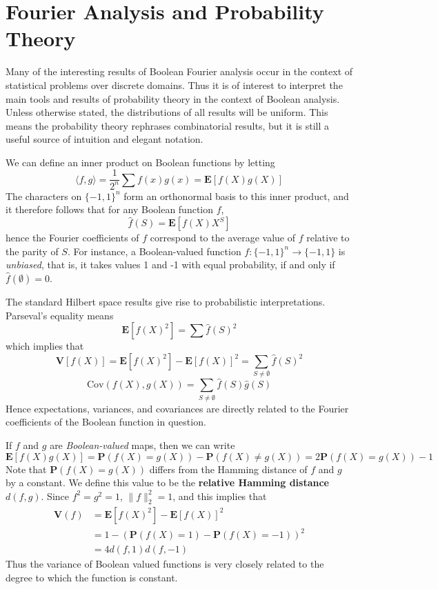 \section{Fourier Analysis and Probability Theory}

Many of the interesting results of Boolean Fourier analysis occur in the context of statistical problems over discrete domains. Thus it is of interest to interpret the main tools and results of probability theory in the context of Boolean analysis. Unless otherwise stated, the distributions of all results will be uniform. This means the probability theory rephrases combinatorial results, but it is still a useful source of intuition and elegant notation.

We can define an inner product on Boolean functions by letting
%
\[ \langle f, g \rangle = \frac{1}{2^n} \sum f(x)g(x) = \mathbf{E}[f(X)g(X)] \]
%
The characters on $\{ -1, 1 \}^n$ form an orthonormal basis to this inner product, and it therefore follows that for any Boolean function $f$,
%
\[ \widehat{f}(S) = \mathbf{E}[f(X)X^S] \]
%
hence the Fourier coefficients of $f$ correspond to the average value of $f$ relative to the parity of $S$. For instance, a Boolean-valued function $f: \{ -1, 1 \}^n \to \{ -1, 1 \}$ is {\it unbiased}, that is, it takes values 1 and -1 with equal probability, if and only if $\widehat{f}(\emptyset) = 0$.

The standard Hilbert space results give rise to probabilistic interpretations. Parseval's equality means
%
\[ \mathbf{E}[f(X)^2] = \sum \widehat{f}(S)^2 \]
%
which implies that
%
\[ \mathbf{V}[f(X)] = \mathbf{E}[f(X)^2] - \mathbf{E}[f(X)]^2 = \sum_{S \neq \emptyset} \widehat{f}(S)^2 \]
%
\[ \text{Cov}(f(X),g(X)) = \sum_{S \neq \emptyset} \widehat{f}(S) \widehat{g}(S) \]
%
Hence expectations, variances, and covariances are directly related to the Fourier coefficients of the Boolean function in question.

If $f$ and $g$ are {\it Boolean-valued} maps, then we can write
%
\[ \mathbf{E}[f(X)g(X)] = \mathbf{P}(f(X) = g(X)) - \mathbf{P}(f(X) \neq g(X)) = 2\mathbf{P}(f(X) = g(X)) - 1 \]
%
Note that $\mathbf{P}(f(X) = g(X))$ differs from the Hamming distance of $f$ and $g$ by a constant. We define this value to be the {\bf relative Hamming distance} $d(f,g)$. Since $f^2 = g^2 = 1$, $\| f \|_2^2 = 1$, and this implies that
%
\begin{align*}
    \mathbf{V}(f) &= \mathbf{E}[f(X)^2] - \mathbf{E}[f(X)]^2\\
    &= 1 - (\mathbf{P}(f(X) = 1) - \mathbf{P}(f(X) = -1))^2\\
    &= 4d(f,1)d(f,-1)
\end{align*}
%
Thus the variance of Boolean valued functions is very closely related to the degree to which the function is constant.

